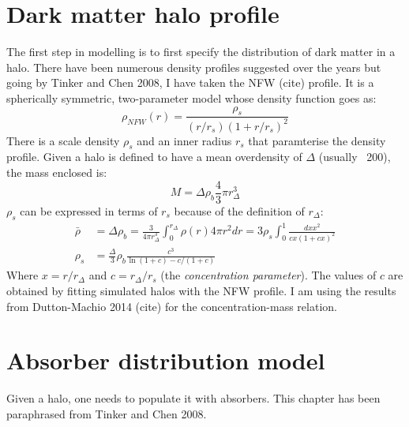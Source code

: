 \documentclass[12pt,a4paper,twoside]{book}
\begin{document}
 	\section{Dark matter halo profile}
		The first step in modelling is to first specify the distribution of dark matter in a halo. There have been numerous density profiles suggested over the years but going by Tinker and Chen 2008, I have taken the NFW (cite) profile. It is a spherically symmetric, two-parameter model whose density function goes as:
		\begin{equation}
			\rho_{NFW}(r)=\frac{\rho_s}{(r/r_s)(1+r/r_s)^2}
		\end{equation}
	 	There is a scale density $\rho_s$ and an inner radius $r_s$ that paramterise the density profile. Given a halo is defined to have a mean overdensity of $\Delta$ (usually ~200), the mass enclosed is:
	 	$$
	 	M=\Delta\rho_b\frac{4}{3}\pi r_{\Delta}^3
	 	$$
	 	$\rho_s$ can be expressed in terms of $r_s$ because of the definition of $r_{\Delta}$:
	 	$$
	 	\begin{aligned}
	 	\bar{\rho}&=\Delta\rho_b=\frac{3}{4\pi r_\Delta^3}\int_0^{r_\Delta}\rho(r)4\pi r^2dr
	 	=3\rho_s\int_0^1\frac{dxx^2}{cx(1+cx)^2}\\
	 	\rho_s&=\frac{\Delta}{3}\rho_b\frac{c^3}{\ln(1+c)-c/(1+c)}
	 	\end{aligned}
	 	$$
	 	Where $x=r/r_{\Delta}$ and $c=r_\Delta/r_s$ (the \emph{concentration parameter}). The values of $c$ are obtained by fitting simulated halos with the NFW profile. I am using the results from Dutton-Machio 2014 (cite) for the concentration-mass relation.
 	\section{Absorber distribution model}
	 	Given a halo, one needs to populate it with absorbers. This chapter has been paraphrased from Tinker and Chen 2008.
\end{document}
